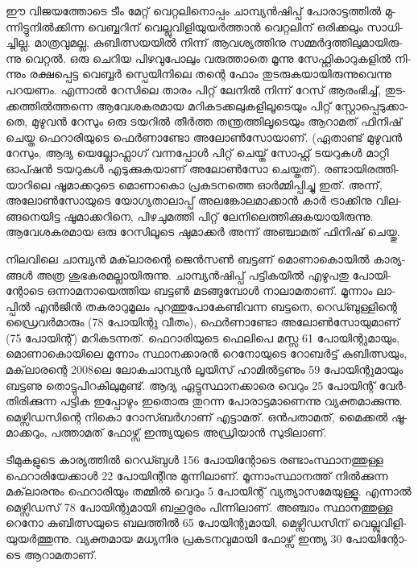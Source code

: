 ഈ വി­ജ­യ­ത്തോ­ടെ ടീം മേ­റ്റ് വെ­റ്റ­ലി­നൊ­പ്പം ചാ­മ്പ്യന്‍­ഷി­പ്പ് പോ­രാ­ട്ട­ത്തില്‍ മു­ന്നി­ട്ടു­നില്‍­ക്കി­ന്ന വെ­ബ്ബ­റി­ന് 
വെ­ല്ലു­വി­ളി­യു­യര്‍­ത്താന്‍ വെ­റ്റ­ലി­ന് ഒരി­ക്ക­ലും സാ­ധി­ച്ചി­ല്ല. മാ­ത്ര­വു­മ­ല്ല, കു­ബി­ത്സ­യ­യില്‍ നി­ന്ന് ആവ­ശ്യ­ത്തി­നു 
സമ്മര്‍­ദ്ദ­ത്തി­ലു­മാ­യി­രു­ന്നു വെ­റ്റല്‍. ഒരു ചെ­റിയ പി­ഴ­വു­പോ­ലും വരു­ത്താ­തെ മൂ­ന്നു സേ­ഫ്റ്റി­കാ­റു­ക­ളില്‍ നി­ന്നും രക്ഷ­പ്പെ­ട്ട 
വെ­ബ്ബര്‍ സ്പെ­യി­നി­ലെ തന്റെ ഫോം തു­ട­രു­ക­യാ­യി­രു­ന്നു­വെ­ന്നു പറ­യ­ണം. എന്നാല്‍ റേ­സി­ലെ താ­രം പി­റ്റ് ലേ­നില്‍ നി­ന്ന് 
റേ­സ് ആരം­ഭി­ച്ച്, തു­ട­ക്ക­ത്തില്‍­ത്ത­ന്നെ ആവേ­ശ­ക­ര­മായ മറി­ക­ട­ക്ക­ലു­ക­ളി­ലൂ­ടെ­യും പി­റ്റ് സ്റ്റോ­പ്പെ­ടു­ക്കാ­തെ, മു­ഴു­വന്‍ റേ­സും 
ഒരു ടയ­റില്‍ തീര്‍­ത്ത തന്ത്ര­ത്തി­ലൂ­ടെ­യും ആറാ­മ­ത് ഫി­നി­ഷ് ചെ­യ്ത ഫെ­റാ­രി­യു­ടെ ഫെര്‍­ണാ­ണ്ടോ അലോണ്‍­സോ­യാ­ണ്. 
(ഏ­താ­ണ്ട് മു­ഴു­വന്‍ റേ­സും, ആദ്യ യെ­ല്ലോ­ഫ്ലാ­ഗ് വന്ന­പ്പോള്‍ പി­റ്റ് ചെ­യ്ത് സോ­ഫ്റ്റ് ടയ­റു­കള്‍ മാ­റ്റി ഓപ്ഷന്‍ ടയ­റു­കള്‍ 
എടു­ക്കു­ക­യാ­ണ് അലോണ്‍­സോ ചെ­യ്ത­ത്). രണ്ടാ­യി­ര­ത്തി­യാ­റി­ലെ ഷൂ­മാ­ക്ക­റു­ടെ മൊ­ണാ­കൊ പ്ര­ക­ട­ന­ത്തെ ഓര്‍­മ്മി­പ്പി­ച്ചു 
ഇത്. അന്ന്, അലോണ്‍­സോ­യു­ടെ യോ­ഗ്യ­താ­ലാ­പ്പ് അല­ങ്കോ­ല­മാ­ക്കാന്‍ കാര്‍ ട്രാ­ക്കി­നു വി­ല­ങ്ങ­നെ­യി­ട്ട ഷൂ­മാ­ക്ക­റി­നെ, 
പി­ഴ­ചു­മ­ത്തി പി­റ്റ് ലേ­നി­ലെ­ത്തി­ക്കു­ക­യാ­യി­രു­ന്നു. ആവേ­ശ­ക­ര­മായ ഒരു റേ­സി­ലൂ­ടെ ഷു­മാ­ക്കര്‍ അന്ന് അഞ്ചാ­മ­ത് ഫി­നി­ഷ് 
ചെ­യ്തു.

­നി­ല­വി­ലെ ചാ­മ്പ്യന്‍ മക്‌­ലാ­ര­ന്റെ ജെന്‍­സണ്‍ ബട്ട­ണ് മൊ­ണാ­കൊ­യില്‍ കാ­ര്യ­ങ്ങള്‍ അത്ര ശു­ഭ­ക­ര­മ­ല്ലാ­യി­രു­ന്നു. 
ചാ­മ്പ്യന്‍­ഷി­പ്പ് പട്ടി­ക­യില്‍ എഴു­പ­തു പോ­യി­ന്റോ­ടെ ഒന്നാ­മ­നാ­യെ­ത്തിയ ബട്ടണ്‍ മട­ങ്ങു­മ്പോള്‍ നാ­ലാ­മ­താ­ണ്. മൂ­ന്നാം 
ലാ­പ്പില്‍ എന്‍­ജിന്‍ തക­രാ­റു­മൂ­ലം പു­റ­ത്തു­പോ­കേ­ണ്ടി­വ­ന്ന ബട്ട­നെ, റെ­ഡ്ബു­ള്ളി­ന്റെ ഡ്രൈ­വര്‍­മാ­രും (78 പോ­യി­ന്റു വീ­തം­),
ഫെര്‍­ണാ­ണ്ടോ അലോണ്‍­സോ­യു­മാ­ണ് (75 പോ­യി­ന്റ്) മറി­ക­ട­ന്ന­ത്. ഫെ­റാ­രി­യു­ടെ ഫെ­ലി­പെ മസ്സ 61 പോ­യി­ന്റു­മാ­യും, 
മൊ­ണാ­കൊ­യി­ലെ മൂ­ന്നാം സ്ഥാ­ന­ക്കാ­രന്‍ റെ­നോ­യു­ടെ റോ­ബര്‍­ട്ട് കു­ബി­ത്സ­യും, മക്‌­ലാ­ര­ന്റെ 2008­ലെ ലോ­ക­ചാ­മ്പ്യന്‍ 
ലൂ­യി­സ് ഹാ­മില്‍­ട്ട­ണും 59 പോ­യി­ന്റു­മാ­യും ബട്ട­ണു തൊ­ട്ടു­പി­റ­കി­ലു­മു­ണ്ട്. ആദ്യ ഏട്ടു­സ്ഥാ­ന­ക്കാ­രെ വെ­റും 25 പോ­യി­ന്റ് 
വേര്‍­തി­രി­ക്കു­ന്ന പട്ടിക ഇപ്പോ­ഴും ഇതൊ­രു തു­റ­ന്ന പോ­രാ­ട്ട­മാ­ണെ­ന്നു വ്യ­ക്ത­മാ­ക്കു­ന്നു. മെ­ഴ്സി­ഡ­സി­ന്റെ നി­കൊ 
റോ­സ്ബര്‍­ഗാ­ണ് എട്ടാ­മ­ത്. ഒന്‍­പ­താ­മ­ത്, മൈ­ക്കല്‍ ഷൂ­മാ­ക്ക­റും, പത്താ­മ­ത് ഫോ­ഴ്സ് ഇന്ത്യ­യു­ടെ അഡ്രി­യാന്‍ സു­ടി­ലാ­ണ്.

­ടീ­മു­ക­ളു­ടെ കാ­ര്യ­ത്തില്‍ റെ­ഡ്ബുള്‍ 156 പോ­യി­ന്റോ­ടെ രണ്ടാം­സ്ഥാ­ന­ത്തു­ള്ള ഫെ­റാ­രി­യേ­ക്കാള്‍ 22 പോ­യി­ന്റി­നു 
മു­ന്നി­ലാ­ണ്. മൂ­ന്നാം­സ്ഥാ­ന­ത്ത് നില്‍­ക്കു­ന്ന മക്‌­ലാ­ര­നും ഫെ­റാ­രി­യും തമ്മില്‍ വെ­റും 5 പോ­യി­ന്റ് വ്യ­ത്യാ­സ­മേ­യു­ള്ളൂ. 
എന്നാല്‍ മെ­ഴ്സി­ഡ­സ് 78 പോ­യി­ന്റു­മാ­യി ബഹു­ദൂ­രം പി­ന്നി­ലാ­ണ്. അഞ്ചാം സ്ഥാ­ന­ത്തു­ള്ള റെ­നോ കു­ബി­ത്സ­യു­ടെ 
ബല­ത്തില്‍ 65 പോ­യി­ന്റു­മാ­യി, മെ­ഴ്സി­ഡ­സി­ന് വെ­ല്ലു­വി­ളി­യു­യര്‍­ത്തു­ന്നു. വ്യ­ക്ത­മായ മധ്യ­നിര പ്ര­ക­ട­ന­വു­മാ­യി ഫോ­ഴ്സ് 
ഇന്ത്യ 30 പോ­യി­ന്റോ­ടെ ആറാ­മ­താ­ണ്.

